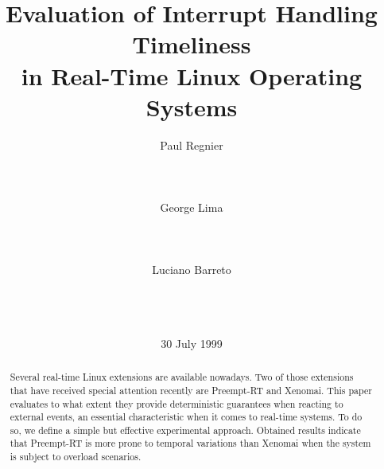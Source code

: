 \documentclass{acm_proc_article-sp}
\begin{document}


     

\title{Evaluation of Interrupt Handling Timeliness\\in Real-Time Linux Operating Systems}

\author{
\alignauthor
Paul Regnier\\%
       \\
       \\
       \\
%
\alignauthor
George Lima \\%
       \\
       \\
       \\
%
\alignauthor
Luciano Barreto \\%
       \\
       \\
       \\
}

\date{30 July 1999}


\maketitle

\begin{abstract}
  Several real-time Linux extensions are available nowadays. Two of those extensions
  that have received special attention recently are Preempt-RT and Xenomai. This
  paper evaluates to what extent they provide deterministic guarantees when reacting
  to external events, an essential characteristic when it comes to real-time
  systems. To do so, we define a simple but effective experimental approach.
  Obtained results indicate that Preempt-RT is more prone to temporal variations
  than Xenomai when the system is subject to overload scenarios.
\end{abstract}
      
\end{document}
